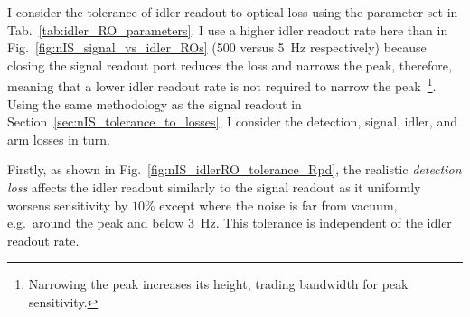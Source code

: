 I consider the tolerance of idler readout to optical loss using the parameter set in Tab.~\ref{tab:idler_RO_parameters}. I use a higher idler readout rate here than in Fig.~\ref{fig:nIS_signal_vs_idler_ROs} (500 versus 5~Hz respectively) because closing the signal readout port reduces the loss and narrows the peak, therefore, meaning that a lower idler readout rate is not required to narrow the peak~\footnote{Narrowing the peak increases its height, trading bandwidth for peak sensitivity.}. %
Using the same methodology as the signal readout in Section~\ref{sec:nIS_tolerance_to_losses}, I consider the detection, signal, idler, and arm losses in turn.

Firstly, as shown in Fig.~\ref{fig:nIS_idlerRO_tolerance_Rpd}, the realistic \emph{detection loss} affects the idler readout similarly to the signal readout as it uniformly worsens sensitivity by $10\%$ except where the noise is far from vacuum, e.g.\ around the peak and below 3~Hz. %
This tolerance is independent of the idler readout rate. %

